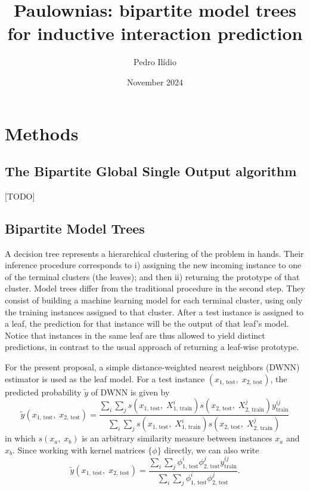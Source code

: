 \documentclass{article}
\title{Paulownias: bipartite model trees for inductive interaction prediction}
\author{Pedro Ilídio}
\date{November 2024}
\begin{document}
\maketitle

\section{Methods}

\subsection{The Bipartite Global Single Output algorithm}
[TODO]

\subsection{Bipartite Model Trees}
\label{sec:bipartite-model-trees}
A decision tree represents a hierarchical clustering of the problem in hands. Their inference procedure corresponds to i) assigning the new incoming instance to one of the terminal clusters (the leaves); and then ii) returning the prototype of that cluster. Model trees differ from the traditional procedure in the second step. They consist of building a machine learning model for each terminal cluster, using only the training instances assigned to that cluster. After a test instance is assigned to a leaf, the prediction for that instance will be the output of that leaf's model. Notice that instances in the same leaf are thus allowed to yield distinct predictions, in contrast to the usual approach of returning a leaf-wise prototype.

For the present proposal, a simple distance-weighted nearest neighbors (DWNN) estimator is used as the leaf model. For a test instance $(x_\text{1, test},\; x_\text{2, test})$, the predicted probability $\tilde y$ of DWNN is given by
%
\begin{equation}
    \label{eq:dwnn}
    \tilde y (x_\text{1, test},\; x_\text{2, test}) = 
        \frac{
            \sum_i\sum_j
            s(x_\text{1, test},\; X^i_\text{1, train})
            s(x_\text{2, test},\; X^j_\text{2, train})
            y^{ij}_\text{train}
        }{
            \sum_i\sum_j
            s(x_\text{1, test},\; X^i_\text{1, train})
            s(x_\text{2, test},\; X^j_\text{2, train})
        }
\end{equation}
%
in which $s(x_a,\; x_b)$ is an arbitrary similarity measure between instances $x_a$ and $x_b$. Since working with kernel matrices $\{\phi\}$ directly, we can also write
%
\begin{equation}
    \tilde y (x_\text{1, test},\; x_\text{2, test}) = 
        \frac{
            \sum_i\sum_j
            \phi^i_\text{1, test}
            \phi^j_\text{2, test}
            y^{ij}_\text{train}
        }{
            \sum_i\sum_j
            \phi^i_\text{1, test}
            \phi^j_\text{2, test}
        }\text{.}
\end{equation}
\end{document}
